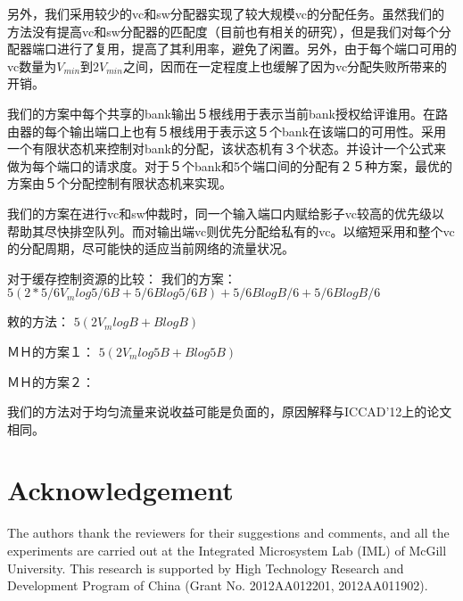 ﻿\documentclass[10pt,journal]{IEEEtran}
\begin{document}
另外，我们采用较少的vc和sw分配器实现了较大规模vc的分配任务。虽然我们的方法没有提高vc和sw分配器的匹配度（目前也有相关的研究），但是我们对每个分配器端口进行了复用，提高了其利用率，避免了闲置。另外，由于每个端口可用的vc数量为$V_{min}$到$2V_{min}$之间，因而在一定程度上也缓解了因为vc分配失败所带来的开销。

我们的方案中每个共享的bank输出５根线用于表示当前bank授权给评谁用。在路由器的每个输出端口上也有５根线用于表示这５个bank在该端口的可用性。采用一个有限状态机来控制对bank的分配，该状态机有３个状态。并设计一个公式来做为每个端口的请求度。对于５个bank和5个端口间的分配有２５种方案，最优的方案由５个分配控制有限状态机来实现。

我们的方案在进行vc和sw仲裁时，同一个输入端口内赋给影子vc较高的优先级以帮助其尽快排空队列。而对输出端vc则优先分配给私有的vc。以缩短采用和整个vc的分配周期，尽可能快的适应当前网络的流量状况。

对于缓存控制资源的比较：
我们的方案：
$5(2*5/6V_mlog5/6B+5/6Blog5/6B)+5/6BlogB/6+5/6BlogB/6$

敕的方法：
$5(2V_mlogB+BlogB)$

ＭＨ的方案１：
$5(2V_mlog5B+Blog5B)$

ＭＨ的方案２：


我们的方法对于均匀流量来说收益可能是负面的，原因解释与ICCAD'12上的论文相同。

\section*{Acknowledgement}
The authors thank the reviewers for their suggestions and comments, and all the experiments are carried out at the Integrated Microsystem Lab (IML) of McGill University. This research is supported by High Technology Research and Development Program of China (Grant No. 2012AA012201, 2012AA011902).



\end{document}
